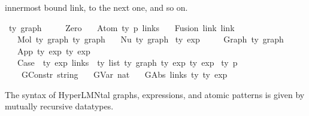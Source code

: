 \begin{isabellebody}
\begin{isamarkuptext}
innermost bound link,  to the next one, and so on.%
\end{isamarkuptext}\isamarkuptrue%
\isamarkupfalse%
\ {\isacharprime}{\kern0pt}ty\ graph\ {\isacharequal}{\kern0pt}\isanewline
\ \ \ \ Zero\isanewline
\ \ {\isacharbar}{\kern0pt}\ Atom\ {\isachardoublequoteopen}{\isacharprime}{\kern0pt}ty\ p{\isachardoublequoteclose}\ links\isanewline
\ \ {\isacharbar}{\kern0pt}\ Fusion\ link\ link\isanewline
\ \ {\isacharbar}{\kern0pt}\ Mol\ {\isachardoublequoteopen}{\isacharprime}{\kern0pt}ty\ graph{\isachardoublequoteclose}\ {\isachardoublequoteopen}{\isacharprime}{\kern0pt}ty\ graph{\isachardoublequoteclose}\isanewline
\ \ {\isacharbar}{\kern0pt}\ Nu\ {\isachardoublequoteopen}{\isacharprime}{\kern0pt}ty\ graph{\isachardoublequoteclose}\isanewline
{}\ {\isacharprime}{\kern0pt}ty\ exp\ {\isacharequal}{\kern0pt}\isanewline
\ \ \ \ Graph\ {\isachardoublequoteopen}{\isacharprime}{\kern0pt}ty\ graph{\isachardoublequoteclose}\isanewline
\ \ {\isacharbar}{\kern0pt}\ App\ {\isachardoublequoteopen}{\isacharprime}{\kern0pt}ty\ exp{\isachardoublequoteclose}\ {\isachardoublequoteopen}{\isacharprime}{\kern0pt}ty\ exp{\isachardoublequoteclose}\ {\isacharparenleft}{\kern0pt}\ {\isacartoucheopen}{\isasymcdot}{\isacartoucheclose}\ {}{}{}{\isacharparenright}{\kern0pt}\isanewline
\ \ {\isacharbar}{\kern0pt}\ Case\ \ {\isachardoublequoteopen}{\isacharprime}{\kern0pt}ty\ exp{\isachardoublequoteclose}\ {\isachardoublequoteopen}{\isacharparenleft}{\kern0pt}links\ {\isacharasterisk}{\kern0pt}\ {\isacharprime}{\kern0pt}ty{\isacharparenright}{\kern0pt}\ list{\isachardoublequoteclose}\ {\isachardoublequoteopen}{\isacharprime}{\kern0pt}ty\ graph{\isachardoublequoteclose}\ {\isachardoublequoteopen}{\isacharprime}{\kern0pt}ty\ exp{\isachardoublequoteclose}\ {\isachardoublequoteopen}{\isacharprime}{\kern0pt}ty\ exp{\isachardoublequoteclose}\isanewline
{}\ {\isacharprime}{\kern0pt}ty\ p\ {\isacharequal}{\kern0pt}\isanewline
\ \ \ \ GConstr\ string\isanewline
\ \ {\isacharbar}{\kern0pt}\ GVar\ nat\isanewline
\ \ {\isacharbar}{\kern0pt}\ GAbs\ links\ {\isacharprime}{\kern0pt}ty\ {\isachardoublequoteopen}{\isacharprime}{\kern0pt}ty\ exp{\isachardoublequoteclose}%
\begin{isamarkuptext}%
The syntax of HyperLMNtal graphs, expressions, and atomic patterns is
given by mutually recursive datatypes.%
\end{isamarkuptext}\isamarkuptrue%
%
\begin{isamarkuptext}%

\end{isamarkuptext}
\end{isabellebody}
